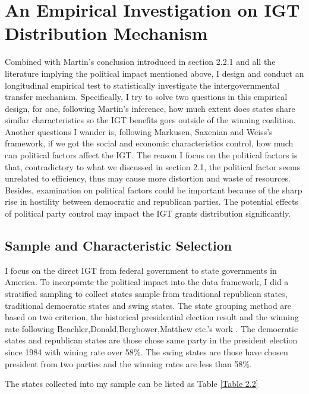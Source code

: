 \section{An Empirical Investigation on IGT Distribution Mechanism}
Combined with Martin's \cite{martin2018dividing} conclusion introduced in section 2.2.1 and all the literature implying the political impact mentioned above, I design and conduct an longitudinal empirical test to statistically investigate the intergovernmental transfer mechanism. Specifically, I try to solve two questions in this empirical design, for one, following Martin's inference, how much extent does states share similar characteristics so the IGT benefits goes outside of the winning coalition. Another questions I wander is, following Markusen, Saxenian and Weiss's framework, if we got the social and economic characteristics control, how much can political factors affect the IGT. The reason I focus on the political factors is that, contradictory to what we discussed in section 2.1, the political factor seems unrelated to efficiency, thus may cause more distortion and waste of resources. Besides, examination on political factors could be important because of the sharp rise in hostility between democratic and republican parties. The potential effects of political party control may impact the IGT grants distribution significantly.  

\subsection{Sample and Characteristic Selection}
I focus on the direct IGT from federal government to state governments in America. To incorporate the political impact into the data framework, I did a stratified sampling to collect states sample from traditional republican states, traditional democratic states and swing states.
The state grouping method are based on two criterion, the historical presidential election result and the winning rate following Beachler,Donald,Bergbower,Matthew etc.'s work \cite{beachler2015presidential}. The democratic states and republican states are those chose same party in the president election since 1984 with wining rate over 58\%. The swing states are those have chosen president from two parties and the winning rates are less than 58\%.

The states collected into my sample can be listed as Table \ref*{Table 2.2}

